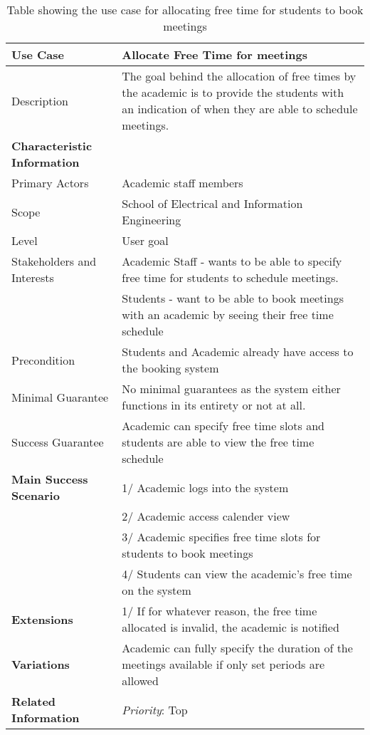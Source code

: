 \documentclass[11pt, a4paper]{article}
\begin{document}
	\begin{table}[t]
			\centering
			\caption{Table showing the use case for allocating free time for students to book meetings}
			\label{tab:freeTimeUseCase}
			\begin{tabular}{| p{45mm} | p{10cm} |}
				\hline
				\textbf{Use Case} & \textbf{Allocate Free Time for meetings} \\
				\hline \hline
				Description &  The goal behind the allocation of free times by the academic is to provide the students with an indication of when they are able to schedule meetings. \\
				\hline	
				\textbf{Characteristic Information} & \\
				\hline
				Primary Actors & Academic staff members \\
				\hline
				Scope & School of Electrical and Information Engineering\\
				\hline
				Level & User goal \\
				\hline
				Stakeholders and Interests & Academic Staff - wants to be able to specify free time for students to schedule meetings. \\ & Students - want to be able to book meetings with an academic by seeing their free time schedule \\
				\hline
				Precondition & Students and Academic already have access to the booking system \\
				\hline
				Minimal Guarantee & No minimal guarantees as the system either functions in its entirety or not at all.\\
				\hline
				Success Guarantee & Academic can specify free time slots and students are able to view the free time schedule \\
				\hline
				\textbf{Main Success Scenario} & 1/ Academic logs into the system \\
				& 2/ Academic access calender view \\
				& 3/ Academic specifies free time slots for students to book meetings \\
				& 4/ Students can view the academic's free time on the system \\
				\hline	
				\textbf{Extensions} & 1/ If for whatever reason, the free time allocated is invalid, the academic is notified \\
				\hline
				\textbf{Variations} & Academic can fully specify the duration of the meetings available if only set periods are allowed\\
				\hline
				\textbf{Related Information} & \textit{Priority}: Top\\

\end{tabular}
\end{table}
\end{document}
